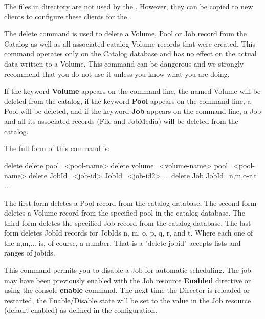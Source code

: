 \begin{description}
\begin{description}
The files in  directory are not used by the \bareosDir.
However, they can be copied to new clients to configure these clients for the \bareosDir.


    \end{description}


\item [delete]
   The delete command is used to delete a Volume, Pool or Job record from
   the Catalog as well as all associated catalog Volume records that were
   created.  This command operates only on the Catalog database and has no
   effect on the actual data written to a Volume.  This command can be
   dangerous and we strongly recommend that you do not use it unless you
   know what you are doing.

   If the keyword {\bf Volume} appears on the command line, the named
   Volume will be deleted from the catalog, if the keyword {\bf Pool}
   appears on the command line, a Pool will be deleted, and if the keyword
   {\bf Job} appears on the command line, a Job and all its associated
   records (File and JobMedia) will be deleted from the catalog.

   The full form of this command is:

\begin{bconsole}{delete}
delete pool=<pool-name>
delete volume=<volume-name> pool=<pool-name>
delete JobId=<job-id> JobId=<job-id2> ...
delete Job JobId=n,m,o-r,t ...
\end{bconsole}

   The first form deletes a Pool record from the catalog database.  The
   second form deletes a Volume record from the specified pool in the
   catalog database.  The third form deletes the specified Job record from
   the catalog database.  The last form deletes JobId records for JobIds
   n, m, o, p, q, r, and t.  Where each one of the n,m,...  is, of course, a
   number. That is a "delete jobid" accepts lists and ranges of
   jobids.

\item [disable]
  This command permits you to disable a Job for automatic scheduling.
  The job may have been previously enabled with the Job resource
  {\bf Enabled} directive or using the console {\bf enable} command.
  The next time the Director is reloaded or restarted,
  the Enable/Disable state will be set to the value in the Job resource
  (default enabled) as defined in the \bareosDir configuration.


\end{description}
